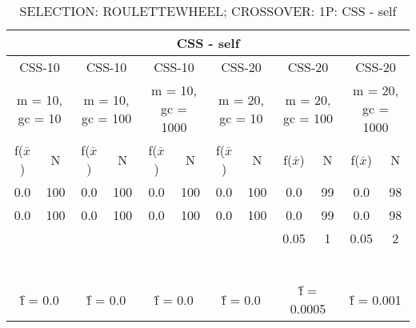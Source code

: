 \begin{table}[H]
	\centering
	\caption{SELECTION: ROULETTEWHEEL; CROSSOVER: 1P: CSS - self}
	\begin{adjustbox}{width=1\textwidth}
		\begin{tabular}{ |c|c||c|c||c|c||c|c||c|c||c|c| }
			\hline
			\multicolumn{12}{|c|}{CSS - self} \\
			\hline
			\multicolumn{2}{|c||}{CSS-10} & \multicolumn{2}{c||}{CSS-10} & \multicolumn{2}{c||}{CSS-10} & \multicolumn{2}{c||}{CSS-20} & \multicolumn{2}{c||}{CSS-20} & \multicolumn{2}{c|}{CSS-20}\\
			\hline
			\multicolumn{2}{|c||}{m = 10, gc = 10} & \multicolumn{2}{c||}{m = 10, gc = 100} & \multicolumn{2}{c||}{m = 10, gc = 1000} & \multicolumn{2}{c||}{m = 20, gc = 10} & \multicolumn{2}{c||}{m = 20, gc = 100} & \multicolumn{2}{c|}{m = 20, gc = 1000}\\
			\hline
			f($\bar{x}$) & N & f($\bar{x}$) & N & f($\bar{x}$) & N & f($\bar{x}$) & N & f($\bar{x}$) & N & f($\bar{x}$) & N\\
			\hline
			\hline
			0.0 & 100 & 0.0 & 100 & 0.0 & 100 & 0.0 & 100 & 0.0 & 99 & 0.0 & 98\\
			\hline
			0.0 & 100 & 0.0 & 100 & 0.0 & 100 & 0.0 & 100 & 0.0 & 99 & 0.0 & 98\\
			&   &   &   &   &   &   &   & 0.05 & 1 & 0.05 & 2\\
			&   &   &   &   &   &   &   &   &   &   &  \\
			&   &   &   &   &   &   &   &   &   &   &  \\
			&   &   &   &   &   &   &   &   &   &   &  \\
			&   &   &   &   &   &   &   &   &   &   &  \\
			&   &   &   &   &   &   &   &   &   &   &  \\
			&   &   &   &   &   &   &   &   &   &   &  \\
			\hline
			\multicolumn{2}{|c||}{\^{f} = 0.0} & \multicolumn{2}{c||}{\^{f} = 0.0} & \multicolumn{2}{c||}{\^{f} = 0.0} & \multicolumn{2}{c||}{\^{f} = 0.0} & \multicolumn{2}{c||}{\^{f} = 0.0005} & \multicolumn{2}{c|}{\^{f} = 0.001}\\
			\hline
		\end{tabular}
	\end{adjustbox}
\end{table}
